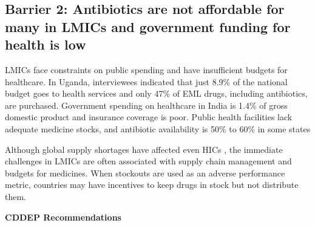 \documentclass[
]{book}
\begin{document}
\hypertarget{barrier-2-antibiotics-are-not-affordable-for-many-in-lmics-and-government-funding-for-health-is-low}{%
\subsection*{Barrier 2: Antibiotics are not affordable for many in LMICs and government funding for health is low}\label{barrier-2-antibiotics-are-not-affordable-for-many-in-lmics-and-government-funding-for-health-is-low}}

LMICs face constraints on public spending and have insufficient budgets for healthcare. In Uganda, interviewees indicated that just 8.9\% of the national budget goes to health services and only 47\% of EML drugs, including antibiotics, are purchased. Government spending on healthcare in India is 1.4\% of gross domestic product and insurance coverage is poor. Public health facilities lack adequate medicine stocks, and antibiotic availability is 50\% to 60\% in some states

Although global supply shortages have affected even HICs , the immediate challenges in LMICs are often associated with supply chain management and budgets for medicines. When stockouts are used as an adverse performance metric, countries may have incentives to keep drugs in stock but not distribute them.

\textbf{CDDEP Recommendations}
\end{document}
